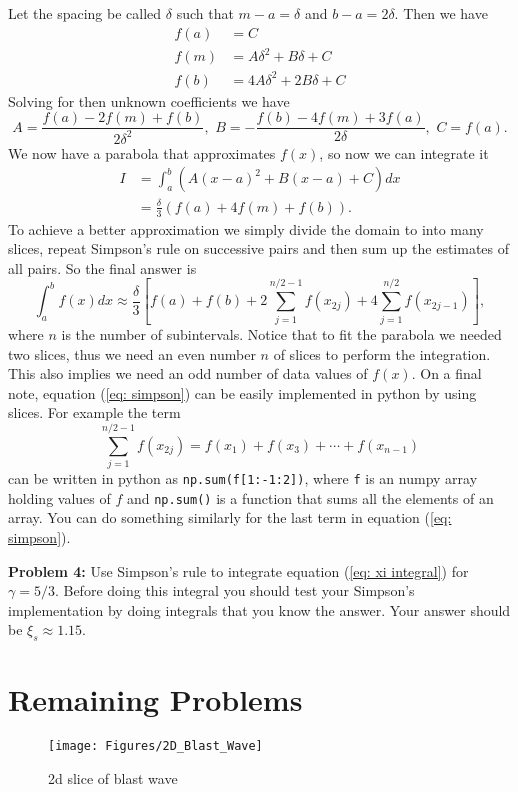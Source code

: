 \documentclass{article}
\begin{document}
Let the spacing be called $\delta$ such that $m-a = \delta$ and $b-a = 2\delta$. Then we have
\begin{align*}
f(a) &=  C\\
f(m) &= A\delta ^2+ B\delta + C\\
f(b) &= 4A\delta^2 + 2B\delta + C
\end{align*}
Solving for then unknown coefficients we have
\begin{equation*}
A = \frac{f(a) - 2f(m) + f(b)}{2\delta^2}, \,\,
B = -\frac{f(b)-4f(m)+3f(a)}{2\delta}, \,\,
C = f(a).
\end{equation*}
We now have a parabola that approximates $f(x)$, so now we can integrate it
\begin{align*}
I &= \int^b_a \left(A(x-a)^2 + B(x-a) + C\right) dx\\
&= \frac{\delta}{3}\left(f(a) + 4f(m) + f(b)\right).
\end{align*}
To achieve a better approximation we simply divide the domain to into many slices, repeat Simpson's rule on successive pairs and then sum up the estimates of all pairs. So the final answer is
\begin{equation}
\label{eq: simpson}
\int_a^b f(x) dx \approx \frac{\delta}{3}\left[f(a) + f(b) + 2\sum_{j=1}^{n/2-1} f(x_{2j}) + 4\sum_{j=1}^{n/2}f(x_{2j-1})\right],
\end{equation}
where $n$ is the number of subintervals. Notice that to fit the parabola we needed two slices, thus we need an even number $n$ of slices to perform the integration. This also implies we need an odd number of data values of $f(x)$. On a final note, equation (\ref{eq: simpson}) can be easily implemented in python by using slices. For example the term
\begin{equation}
\sum_{j=1}^{n/2-1} f(x_{2j})=f(x_1) + f(x_3) + \cdots + f(x_{n-1})
\end{equation}
can be written in python as {\tt np.sum(f[1:-1:2])}, where {\tt f} is an numpy array holding values of $f$ and {\tt np.sum()} is a function that sums all the elements of an array. You can do something similarly for the last term in equation (\ref{eq: simpson}).

\bigskip
\noindent
\textbf{Problem 4:} Use Simpson's rule to integrate equation (\ref{eq: xi integral}) for $\gamma=5/3$. Before doing this integral you should test your Simpson's implementation by doing integrals that you know the answer. Your answer should be $\xi_s \approx 1.15$.


\section{Remaining Problems}
\begin{figure}[h!]
\begin{center}
\texttt{[image: Figures/2D\_Blast\_Wave]}
\end{center}
\caption{2d slice of blast wave}
\label{fig: slice blast wave solution}
\end{figure}
\end{document}
